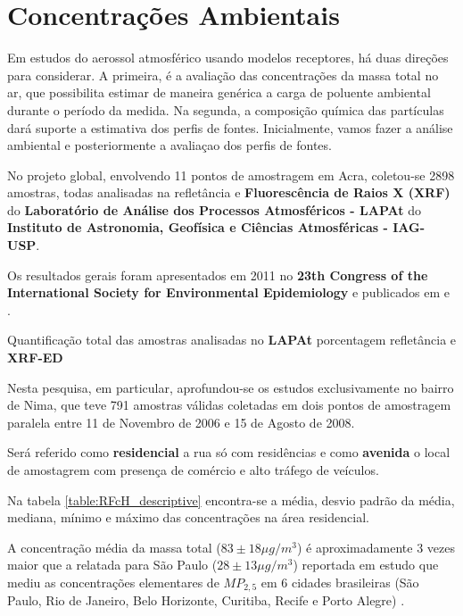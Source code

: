 \section{Concentrações Ambientais}

Em estudos do aerossol atmosférico usando modelos receptores, 
há duas direções para considerar. 
A primeira, é a avaliação das concentrações da massa total no ar, que possibilita 
estimar de maneira genérica a carga de poluente ambiental durante o período da medida. 
Na segunda, a composição química das partículas dará suporte a estimativa 
dos perfis de fontes. Inicialmente, vamos fazer a análise ambiental 
e posteriormente a avaliaçao dos perfis de fontes.  

No projeto global, envolvendo 11 pontos de amostragem em Acra, 
coletou-se 2898 amostras, todas analisadas na refletância e 
\textbf{Fluorescência de Raios X (XRF)} do 
\textbf{Laboratório de Análise dos Processos Atmosféricos - LAPAt} 
do \textbf{Instituto de Astronomia, Geofísica e Ciências Atmosféricas - IAG-USP}.

Os resultados gerais foram apresentados em 2011 no
\textbf{23th Congress of the International Society for Environmental 
Epidemiology} \citep{zhou2011} e publicados em \cite{zhou2013} e \cite{zhou2014}. 

\begin{table}[H]
  \centering
  \begin{scriptsize}
  
  \end{scriptsize}
  \caption{Quantificação total das amostras analisadas no \textbf{LAPAt} porcentagem
          refletância e \textbf{XRF-ED}}
\end{table}

Nesta pesquisa, em particular, aprofundou-se os estudos exclusivamente no bairro de Nima, 
que teve 791 amostras válidas coletadas em dois pontos de amostragem paralela entre 11 de 
Novembro de 2006 e 15 de Agosto de 2008.

Será referido como \textbf{residencial} a rua só com residências e como \textbf{avenida} 
o local de amostagrem com presença de comércio e alto tráfego de veículos.

Na tabela \ref{table:RFcH_descriptive} encontra-se a média, desvio padrão da média, 
mediana, mínimo e máximo das concentrações na área residencial. 

A concentração média da massa total ($83\pm 18 \mu g / m^3$) é aproximadamente
3 vezes maior que a relatada para São Paulo ($28\pm 13 \mu g / m^3$) reportada 
em estudo que mediu as concentrações elementares de $MP_{2,5}$ em 6 cidades 
brasileiras (São Paulo, Rio de Janeiro, Belo Horizonte, Curitiba, Recife e 
Porto Alegre) \cite{andrade2012}. 


